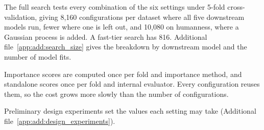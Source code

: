 


The full search tests every combination of the six settings under 5-fold cross-validation, giving 8,160 configurations per dataset where all five downstream models run, fewer where one is left out, and 10,080 on humanness, where a Gaussian process is added. A fast-tier search has 816. Additional file~\ref{app:add:search_size} gives the breakdown by downstream model and the number of model fits.



Importance scores are computed once per fold and importance method, and standalone scores once per fold and internal evaluator. Every configuration reuses them, so the cost grows more slowly than the number of configurations.



Preliminary design experiments set the values each setting may take (Additional file~\ref{app:add:design_experiments}).


